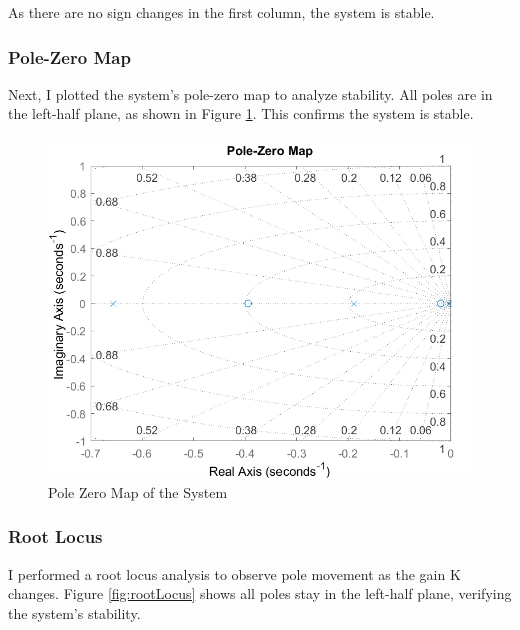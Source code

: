 \documentclass{article}
\begin{document}


\noindent As there are no sign changes in the first column, the system is stable.

\subsubsection{Pole-Zero Map}
Next, I plotted the system's pole-zero map to analyze stability. All poles are in the left-half plane, as shown in Figure \ref{fig:poleZeroMap}. This confirms the system is stable.

\begin{figure}[h!]
	\centering
	\includegraphics[scale=0.75]{images/poleZeroMap.png}
	\caption{Pole Zero Map of the System}
	\label{fig:poleZeroMap}
\end{figure}


\subsubsection{Root Locus} 
I performed a root locus analysis to observe pole movement as the gain K changes. Figure \ref{fig:rootLocus} shows all poles stay in the left-half plane, verifying the system's stability.
\end{document}
